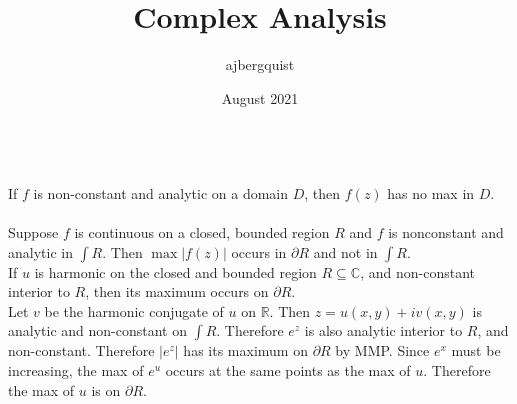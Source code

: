 \documentclass{article}
\title{Complex Analysis}
\author{ajbergquist }
\date{August 2021}
\theoremstyle{definition}
\newcommand{\R}{\mathbb{R}}
\newcommand{\C}{\mathbb{C}}
\begin{document}
\\ If $f$ is non-constant and analytic on a domain $D$, then $f(z)$ has no max in $D$. \\

\\

 Suppose $f$ is continuous on a closed, bounded region $R$ and $f$ is nonconstant and analytic in $\int R$. Then $\max|f(z)|$ occurs in $\partial R$ and not in $\int R$. \\

 If $u$ is harmonic on the closed and bounded region $R\subseteq \C$, and non-constant interior to $R$, then its maximum occurs on $\partial R$. \\

 Let $v$ be the harmonic conjugate of $u$ on $\R$. Then $z = u(x,y) + iv(x,y)$ is analytic and non-constant on $\int R$. Therefore $e^z$ is also analytic interior to $R$, and non-constant. Therefore $|e^z|$ has its maximum on $\partial R$ by MMP. Since $e^x$ must be increasing, the max of $e^u$ occurs at the same points as the max of $u$. Therefore the max of $u$ is on $\partial R$. \\
\end{document}
